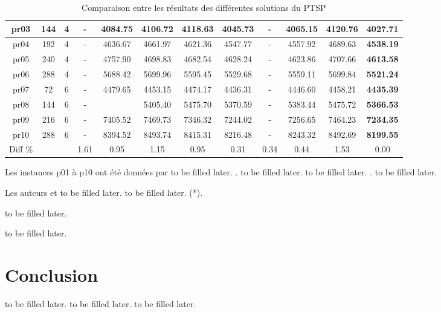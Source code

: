 \begin{table}[h!]
\begin{tabular}{|c|c|c|c|c|c|c|c|c|c|c|c|}
    pr03     & 144 & 4  &    -     & 4084.75 & 4106.72 & 4118.63 & 4045.73 &    -     & 4065.15 & 4120.76 & \textbf{4027.71}  \\\hline
    pr04     & 192 & 4  &    -     & 4636.67 & 4661.97 & 4621.36 & 4547.77 &    -     & 4557.92 & 4689.63 & \textbf{4538.19}  \\\hline
    pr05     & 240 & 4  &    -     & 4757.90 & 4698.83 & 4682.54 & 4628.24 &    -     & 4623.86 & 4707.66 & \textbf{4613.58}  \\\hline
    pr06     & 288 & 4  &    -     & 5688.42 & 5699.96 & 5595.45 & 5529.68 &    -     & 5559.11 & 5699.84 & \textbf{5521.24}  \\\hline
    pr07     & 72  & 6  &    -     & 4479.65 & 4453.15 & 4474.17 & 4436.31 &    -     & 4446.60 & 4458.21 & \textbf{4435.39}  \\\hline
    pr08     & 144 & 6  &    -     &         & 5405.40 & 5475.70 & 5370.59 &    -     & 5383.44 & 5475.72 & \textbf{5366.53}  \\\hline
    pr09     & 216 & 6  &    -     & 7405.52 & 7469.73 & 7346.32 & 7244.02 &    -     & 7256.65 & 7464.23 & \textbf{7234.35}  \\\hline
    pr10     & 288 & 6  &   -      & 8394.52 & 8493.74 & 8415.31 & 8216.48 &    -     & 8243.32 & 8492.69 & \textbf{8199.55}  \\\hline
    Diff \%   &        &       & 1.61    & 0.95    & 1.15    & 0.95    & 0.31    & 0.34    & 0.44    & 1.53    & 0.00   \\\hline 
    \end{tabular}
    \caption{Comparaison entre les résultats des différentes solutions du PTSP}
    \label{tab:ptsp-results-comparison}
\end{table}
\FloatBarrier



\medskip

Les instances p01 à p10 ont été données par \parencite{eilon_distribution_1971} to be filled later. \parencite{christofides_period_1984}. to be filled later. \parencite{chao_new_1995} to be filled later. \parencite{cordeau_tabu_1997}. to be filled later.

\medskip

Les auteurs \parencite{liu_hybridization_2014} et \parencite{cacchiani_set-covering_2014} to be filled later. \parencite{chao_new_1995} to be filled later. (*). 

\medskip
to be filled later.

\medskip
to be filled later.


\medskip

\section{Conclusion}
to be filled later.
to be filled later.
to be filled later.


